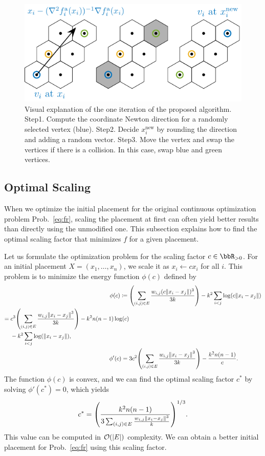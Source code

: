 \documentclass[dvipdfmx,10pt,journal,compsoc]{IEEEtran}
\newcommand{\defeq}{\coloneqq}
\begin{document}
\begin{figure}[t]
  \centering
  \includegraphics[width=\columnwidth]{hex/hex.pdf}
  \caption{Visual explanation of the one iteration of the proposed algorithm. Step1. Compute the coordinate Newton direction for a randomly selected vertex (blue). Step2. Decide $x_i^\mathrm{new}$ by rounding the direction and adding a random vector. Step3. Move the vertex and swap the vertices if there is a collision. In this case, swap blue and green vertices.}
  \label{fig:hex}
\end{figure}

\subsection{Optimal Scaling}\label{ssec:optimalScaling}

When we optimize the initial placement for the original continuous optimization problem Prob.~\eqref{eq:fr}, scaling the placement at first can often yield better results than directly using the unmodified one.
This subsection explains how to find the optimal scaling factor that minimizes $f$ for a given placement.

Let us formulate the optimization problem for the scaling factor $c \in \bbR_{> 0}$.
For an initial placement $X = (x_1, \dots, x_n)$, we scale it as $x_i \gets c x_i$ for all $i$.
This problem is to minimize the energy function $\phi(c)$ defined by
\begin{align*}
  \phi(c) \defeq {} & \qty(\sum_{(i,j) \in E} \frac{w_{i,j} (c \norm{x_i - x_j})^3}{3k}) - k^2 \sum_{i < j} \log(c \norm{x_i - x_j})     \\
  \begin{split}
    = {} & c^3 \qty(\sum_{(i,j) \in E} \frac{w_{i,j} \norm{x_i - x_j}^3}{3k}) - k^2 n(n-1)\log(c) \\
         & - k^2 \sum_{i < j} \log(\norm{x_i - x_j}),
  \end{split} \\
  \phi'(c) = {}     & 3c^2 \qty(\sum_{(i,j) \in E} \frac{w_{i,j} \norm{x_i - x_j}^3}{3k}) - \frac{k^2 n(n-1)}{c}.
\end{align*}
The function $\phi(c)$ is convex, and we can find the optimal scaling factor $c^*$ by solving $\phi'(c^*) = 0$, which yields
\begin{equation}\label{eq:scaling}
  c^* = \qty(\frac{k^2 n(n-1)}{3 \sum_{(i,j) \in E} \frac{w_{i,j} \norm{x_i - x_j}^3}{k}})^{1/3}.
\end{equation}
This value can be computed in $\order{\abs{E}}$ complexity.
We can obtain a better initial placement for Prob.~\eqref{eq:fr} using this scaling factor.
\end{document}
